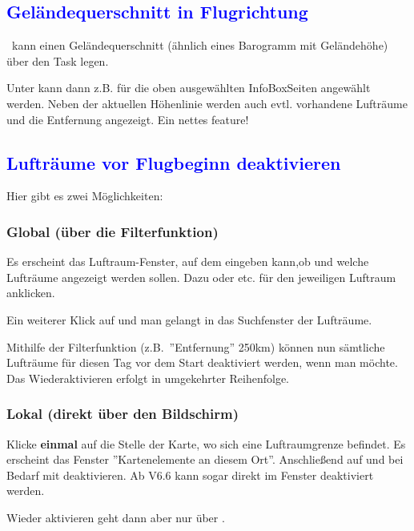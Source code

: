 \subsection{\textcolor{blue}{Geländequerschnitt in Flugrichtung}}
\xc~kann einen Geländequerschnitt (ähnlich eines Barogramm mit Geländehöhe) über den Task legen.
\bc\sk\blink{}\blink{}\ec

Unter  kann dann z.B. für die oben ausgewählten InfoBoxSeiten  angewählt werden.
Neben der aktuellen Höhenlinie werden auch evtl. vorhandene Lufträume und die Entfernung angezeigt.
Ein nettes feature!
\subsection*{\textcolor{blue}{Lufträume vor Flugbeginn deaktivieren}}

Hier gibt es zwei Möglichkeiten:

\subsubsection*{Global (über die Filterfunktion)}
\bc{}\ec

Es erscheint das Luftraum-Fenster, auf dem eingeben kann,ob und welche Lufträume angezeigt werden sollen.
Dazu   oder  etc. für den jeweiligen Luftraum anklicken.

Ein weiterer Klick auf  und man gelangt in das Suchfenster der Lufträume.

Mithilfe der Filterfunktion (z.B.\ ''Entfernung'' 250km) können nun sämtliche Lufträume für diesen Tag vor dem Start
deaktiviert werden, wenn man möchte. Das Wiederaktivieren erfolgt in umgekehrter Reihenfolge.


\subsubsection*{Lokal (direkt über den Bildschirm)}
Klicke {\bf einmal} auf die Stelle der Karte, wo sich eine Luftraumgrenze befindet.
Es erscheint das Fenster ''Kartenelemente an diesem Ort''. Anschließend auf   und bei
Bedarf mit  deaktivieren. Ab V6.6 kann sogar direkt  im Fenster deaktiviert werden.

Wieder aktivieren geht dann aber nur über .

